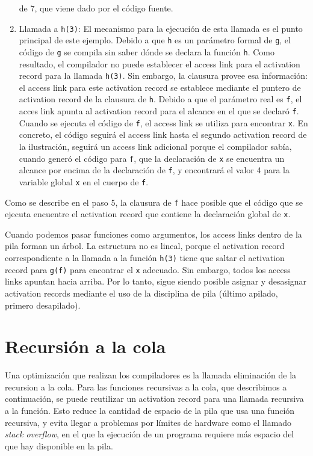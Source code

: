 \documentclass[10pt,a4paper]{report}
\begin{document}
\begin{enumerate}
  de 7, que viene dado por el código fuente.
\item Llamada a \verb|h(3)|: El mecanismo para la ejecución de esta
  llamada es el punto principal de este ejemplo. Debido a que \verb|h|
  es un parámetro formal de \verb|g|, el código de \verb|g| se compila
  sin saber dónde se declara la función \verb|h|. Como resultado, el
  compilador no puede establecer el access link para el activation
  record para la llamada \verb|h(3)|. Sin embargo, la clausura provee
  esa información: el access link para este activation record se
  establece mediante el puntero de activation record de la clausura de
  \verb|h|. Debido a que el parámetro real es \verb|f|, el acces link
  apunta al activation record para el alcance en el que se declaró
  \verb|f|. Cuando se ejecuta el código de \verb|f|, el access link se
  utiliza para encontrar \verb|x|. En concreto, el código seguirá el
  access link hasta el segundo activation record de la ilustración,
  seguirá un access link adicional porque el compilador sabía, cuando
  generó el código para \verb|f|, que la declaración de \verb|x| se
  encuentra un alcance por encima de la declaración de \verb|f|, y
  encontrará el valor 4 para la variable global \verb|x| en el cuerpo
  de \verb|f|.
\end{enumerate}

Como se describe en el paso 5, la clausura de \verb|f| hace posible
que el código que se ejecuta encuentre el activation record que
contiene la declaración global de \verb|x|.

Cuando podemos pasar funciones como argumentos, los access links
dentro de la pila forman un árbol. La estructura no es lineal, porque
el activation record correspondiente a la llamada a la función
\verb|h(3)| tiene que saltar el activation record para \verb|g(f)|
para encontrar el \verb|x| adecuado. Sin embargo, todos los access
links apuntan hacia arriba. Por lo tanto, sigue siendo posible asignar
y desasignar activation records mediante el uso de la disciplina de
pila (último apilado, primero desapilado).


\section{Recursión a la cola}
\par Una optimización que realizan los compiladores es la llamada eliminación de la recursion a la cola. Para las funciones recursivas a la cola, que describimos a continuación, se puede reutilizar un activation record para una llamada recursiva a la
función. Esto reduce la cantidad de espacio de la pila que usa una
función recursiva, y evita llegar a problemas por límites de hardware
como el llamado {\it stack overflow}, en el que la ejecución de un
programa requiere más espacio del que hay disponible en la pila.
\end{document}
